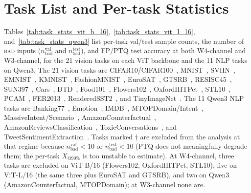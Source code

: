 \documentclass{article}
\makeatletter
\newcommand{\fp}{\textsc{FP}\xspace}
\newcommand{\ptq}{\textsc{PTQ}\xspace}
\newcommand{\bad}{\textsc{bad}\xspace}
\newcommand{\xat}[1]{\ensuremath{X_{@#1\%}}}
\makeatother
\begin{document}
\section{Task List and Per-task Statistics}\label{app:tasks}

Tables~\ref{tab:task_stats_vit_b_16},~\ref{tab:task_stats_vit_l_16}, and~\ref{tab:task_stats_qwen3} list per-task val/test sample counts, the number of \bad{} inputs ($n_{\text{bad}}^{\text{val}}$ and $n_{\text{bad}}^{\text{test}}$), and \fp{}/\ptq{} test accuracy at both W4-channel and W3-channel, for the 21 vision tasks on each ViT backbone and the 11 NLP tasks on Qwen3. The 21 vision tasks are CIFAR10/CIFAR100~\cite{krizhevsky_learning_nodate}, MNIST~\cite{noauthor_mnist_nodate}, SVHN~\cite{netzer_reading_nodate}, EMNIST~\cite{cohen_emnist_2017}, KMNIST~\cite{clanuwat_deep_2018}, FashionMNIST~\cite{xiao_fashion-mnist_2017}, EuroSAT~\cite{helber_eurosat_2019}, GTSRB~\cite{stallkamp_german_2011}, RESISC45~\cite{cheng_remote_2017}, SUN397~\cite{xiao_sun_2016}, Cars~\cite{krause_3d_2013}, DTD~\cite{cimpoi_describing_2014}, Food101~\cite{bossard_food-101_2014}, Flowers102~\cite{nilsback_automated_2008}, OxfordIIITPet~\cite{parkhi_cats_2012}, STL10~\cite{coates_analysis_2011}, PCAM~\cite{veeling_rotation_2018}, FER2013~\cite{goodfellow_challenges_2013}, RenderedSST2~\cite{socher_recursive_nodate}, and TinyImageNet~\cite{le2015tiny}. The 11 Qwen3 NLP tasks are Banking77~\cite{casanueva-etal-2020-efficient}, Emotion~\cite{saravia-etal-2018-carer}, IMDB~\cite{maas-etal-2011-learning}, MTOPDomain/Intent~\cite{li-etal-2021-mtop}, MassiveIntent/Scenario~\cite{fitzgerald2022massive}, AmazonCounterfactual~\cite{oneill-etal-2021-wish}, AmazonReviewsClassification~\cite{keung2020multilingual}, ToxicConversations~\cite{jigsaw-unintended-bias-in-toxicity-classification}, and TweetSentimentExtraction~\cite{tweet-sentiment-extraction}. Tasks marked $\dagger$ are excluded from the analysis at that regime because $n_{\text{bad}}^{\text{val}} < 10$ or $n_{\text{bad}}^{\text{test}} < 10$ (\ptq{} does not meaningfully degrade them; the per-task \xat{90} is too unstable to estimate). At W4-channel, three tasks are excluded on ViT-B/16 (Flowers102, OxfordIIITPet, STL10), five on ViT-L/16 (the same three plus EuroSAT and GTSRB), and two on Qwen3 (AmazonCounterfactual, MTOPDomain); at W3-channel none are.




\end{document}
